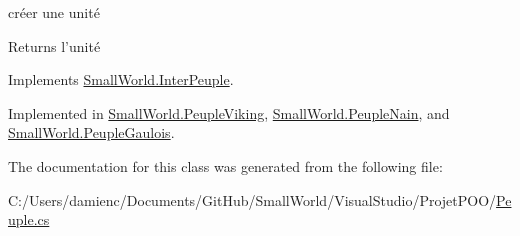 créer une unité 

\begin{DoxyReturn}{Returns}
l'unité 
\end{DoxyReturn}


Implements \hyperlink{interface_small_world_1_1_inter_peuple_affaf908f250e1feb40b90598124dbb56}{Small\-World.\-Inter\-Peuple}.



Implemented in \hyperlink{class_small_world_1_1_peuple_viking_a28216d67245dc1c8db45b4c9d763923f}{Small\-World.\-Peuple\-Viking}, \hyperlink{class_small_world_1_1_peuple_nain_a31cf5c32229c6f88acf69de84a8c6ebf}{Small\-World.\-Peuple\-Nain}, and \hyperlink{class_small_world_1_1_peuple_gaulois_aac9e86d3354a8c4e588a942c705539ee}{Small\-World.\-Peuple\-Gaulois}.



The documentation for this class was generated from the following file\-:\begin{DoxyCompactItemize}
\item 
C\-:/\-Users/damienc/\-Documents/\-Git\-Hub/\-Small\-World/\-Visual\-Studio/\-Projet\-P\-O\-O/\hyperlink{_peuple_8cs}{Peuple.\-cs}\end{DoxyCompactItemize}

